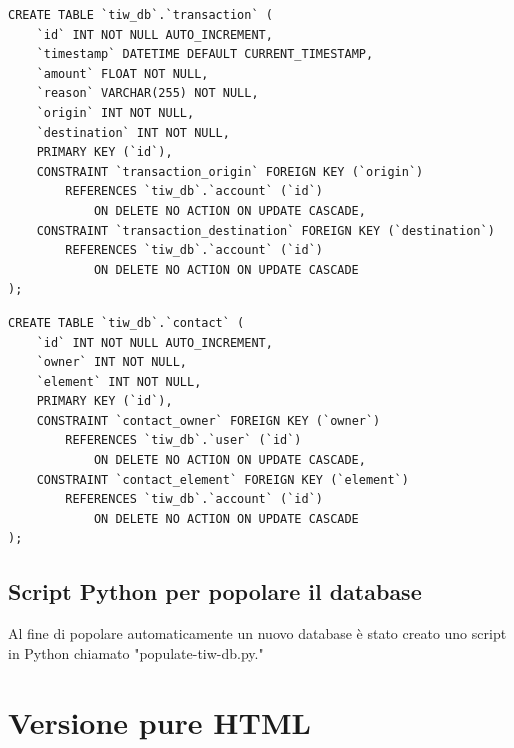 \documentclass{article}
\begin{document}
\begin{verbatim}
CREATE TABLE `tiw_db`.`transaction` (
	`id` INT NOT NULL AUTO_INCREMENT,
	`timestamp` DATETIME DEFAULT CURRENT_TIMESTAMP,
	`amount` FLOAT NOT NULL,
	`reason` VARCHAR(255) NOT NULL,
	`origin` INT NOT NULL,
	`destination` INT NOT NULL,
	PRIMARY KEY (`id`),
	CONSTRAINT `transaction_origin` FOREIGN KEY (`origin`) 
		REFERENCES `tiw_db`.`account` (`id`)
			ON DELETE NO ACTION ON UPDATE CASCADE,
	CONSTRAINT `transaction_destination` FOREIGN KEY (`destination`) 
		REFERENCES `tiw_db`.`account` (`id`) 
			ON DELETE NO ACTION ON UPDATE CASCADE
);
\end{verbatim}

\begin{verbatim}
CREATE TABLE `tiw_db`.`contact` (
	`id` INT NOT NULL AUTO_INCREMENT,
	`owner` INT NOT NULL,
	`element` INT NOT NULL,
	PRIMARY KEY (`id`),
	CONSTRAINT `contact_owner` FOREIGN KEY (`owner`) 
		REFERENCES `tiw_db`.`user` (`id`)
			ON DELETE NO ACTION ON UPDATE CASCADE,
	CONSTRAINT `contact_element` FOREIGN KEY (`element`) 
		REFERENCES `tiw_db`.`account` (`id`) 
			ON DELETE NO ACTION ON UPDATE CASCADE
);
\end{verbatim}

\subsection{Script Python per popolare il database}
Al fine di popolare automaticamente un nuovo database è stato creato uno script in Python chiamato "populate-tiw-db.py." 

\section{Versione pure HTML}
\end{document}
